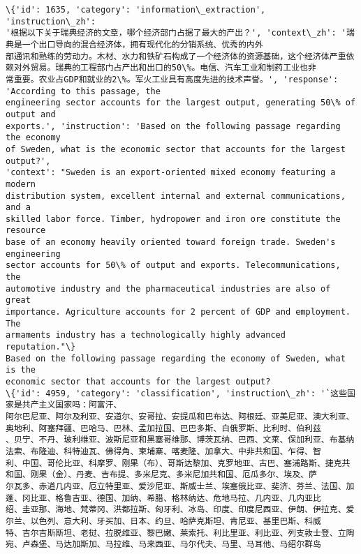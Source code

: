 \documentclass[11pt]{article}
\begin{document}
    \begin{Verbatim}[commandchars=\\\{\}]
\{'id': 1635, 'category': 'information\_extraction', 'instruction\_zh':
'根据以下关于瑞典经济的文章，哪个经济部门占据了最大的产出？', 'context\_zh': '瑞典是一个出口导向的混合经济体，拥有现代化的分销系统、优秀的内外
部通讯和熟练的劳动力。木材、水力和铁矿石构成了一个经济体的资源基础，这个经济体严重依赖对外贸易。瑞典的工程部门占产出和出口的50\%。电信、汽车工业和制药工业也非
常重要。农业占GDP和就业的2\%。军火工业具有高度先进的技术声誉。', 'response': 'According to this passage, the
engineering sector accounts for the largest output, generating 50\% of output and
exports.', 'instruction': 'Based on the following passage regarding the economy
of Sweden, what is the economic sector that accounts for the largest output?',
'context': "Sweden is an export-oriented mixed economy featuring a modern
distribution system, excellent internal and external communications, and a
skilled labor force. Timber, hydropower and iron ore constitute the resource
base of an economy heavily oriented toward foreign trade. Sweden's engineering
sector accounts for 50\% of output and exports. Telecommunications, the
automotive industry and the pharmaceutical industries are also of great
importance. Agriculture accounts for 2 percent of GDP and employment. The
armaments industry has a technologically highly advanced reputation."\}
Based on the following passage regarding the economy of Sweden, what is the
economic sector that accounts for the largest output?
\{'id': 4959, 'category': 'classification', 'instruction\_zh': '`这些国家是共产主义国家吗：阿富汗、
阿尔巴尼亚、阿尔及利亚、安道尔、安哥拉、安提瓜和巴布达、阿根廷、亚美尼亚、澳大利亚、奥地利、阿塞拜疆、巴哈马、巴林、孟加拉国、巴巴多斯、白俄罗斯、比利时、伯利兹
、贝宁、不丹、玻利维亚、波斯尼亚和黑塞哥维那、博茨瓦纳、巴西、文莱、保加利亚、布基纳法索、布隆迪、科特迪瓦、佛得角、柬埔寨、喀麦隆、加拿大、中非共和国、乍得、智
利、中国、哥伦比亚、科摩罗、刚果（布）、哥斯达黎加、克罗地亚、古巴、塞浦路斯、捷克共和国、刚果（金）、丹麦、吉布提、多米尼克、多米尼加共和国、厄瓜多尔、埃及、萨
尔瓦多、赤道几内亚、厄立特里亚、爱沙尼亚、斯威士兰、埃塞俄比亚、斐济、芬兰、法国、加蓬、冈比亚、格鲁吉亚、德国、加纳、希腊、格林纳达、危地马拉、几内亚、几内亚比
绍、圭亚那、海地、梵蒂冈、洪都拉斯、匈牙利、冰岛、印度、印度尼西亚、伊朗、伊拉克、爱尔兰、以色列、意大利、牙买加、日本、约旦、哈萨克斯坦、肯尼亚、基里巴斯、科威
特、吉尔吉斯斯坦、老挝、拉脱维亚、黎巴嫩、莱索托、利比里亚、利比亚、列支敦士登、立陶宛、卢森堡、马达加斯加、马拉维、马来西亚、马尔代夫、马里、马耳他、马绍尔群岛

\end{Verbatim}
\end{document}
